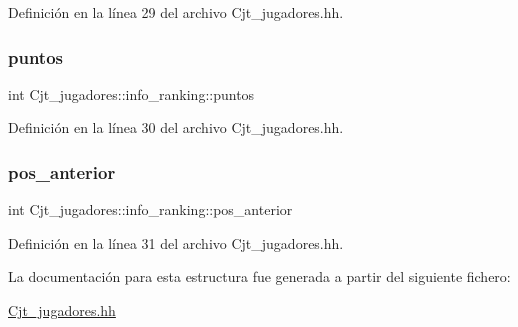 Definición en la línea 29 del archivo Cjt\+\_\+jugadores.\+hh.

\mbox{\label{struct_cjt__jugadores_1_1info__ranking_a9548a26f4ce9f133898897695cf0469f}} 
\subsubsection{\texorpdfstring{puntos}{puntos}}
{\footnotesize\ttfamily int Cjt\+\_\+jugadores\+::info\+\_\+ranking\+::puntos}



Definición en la línea 30 del archivo Cjt\+\_\+jugadores.\+hh.

\mbox{\label{struct_cjt__jugadores_1_1info__ranking_a94cae50fbd756efb92e76e6f9cc396ce}} 
\subsubsection{\texorpdfstring{pos\+\_\+anterior}{pos\_anterior}}
{\footnotesize\ttfamily int Cjt\+\_\+jugadores\+::info\+\_\+ranking\+::pos\+\_\+anterior}



Definición en la línea 31 del archivo Cjt\+\_\+jugadores.\+hh.



La documentación para esta estructura fue generada a partir del siguiente fichero\+:\begin{DoxyCompactItemize}
\item 
\hyperlink{_cjt__jugadores_8hh}{Cjt\+\_\+jugadores.\+hh}\end{DoxyCompactItemize}
